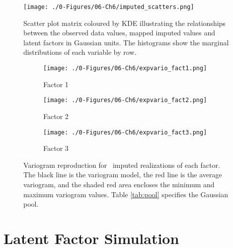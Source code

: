 \begin{figure}[htb!]
    \centering
    \texttt{[image: ./0-Figures/06-Ch6/imputed\_scatters.png]}
    \caption{Scatter plot matrix coloured by \gls{KDE} illustrating the relationships between the observed data values, mapped imputed values and latent factors in Gaussian units. The histograms show the marginal distributions of each variable by row. }
    \label{fig:imputed_scatters}
\end{figure}

\begin{figure}
    \begin{subfigure}{1.0\textwidth}
        \centering
        \texttt{[image: ./0-Figures/06-Ch6/expvario\_fact1.png]}
        \caption{Factor 1}
    \end{subfigure}
    \begin{subfigure}{1.0\textwidth}
        \centering
        \texttt{[image: ./0-Figures/06-Ch6/expvario\_fact2.png]}
        \caption{Factor 2}
    \end{subfigure}
    \begin{subfigure}{1.0\textwidth}
        \centering
        \texttt{[image: ./0-Figures/06-Ch6/expvario\_fact3.png]}
        \caption{Factor 3}
    \end{subfigure}
    \caption{Variogram reproduction for \csnreals \ imputed realizations of each factor. The black line is the variogram model, the red line is the average variogram, and the shaded red area encloses the minimum and maximum variogram values. Table \ref{tab:pool} specifies the Gaussian pool.}
    \label{fig:nmrimp_repro_gvario}
\end{figure}


\FloatBarrier
\section{Latent Factor Simulation}
\label{sec:06fact_sim}

